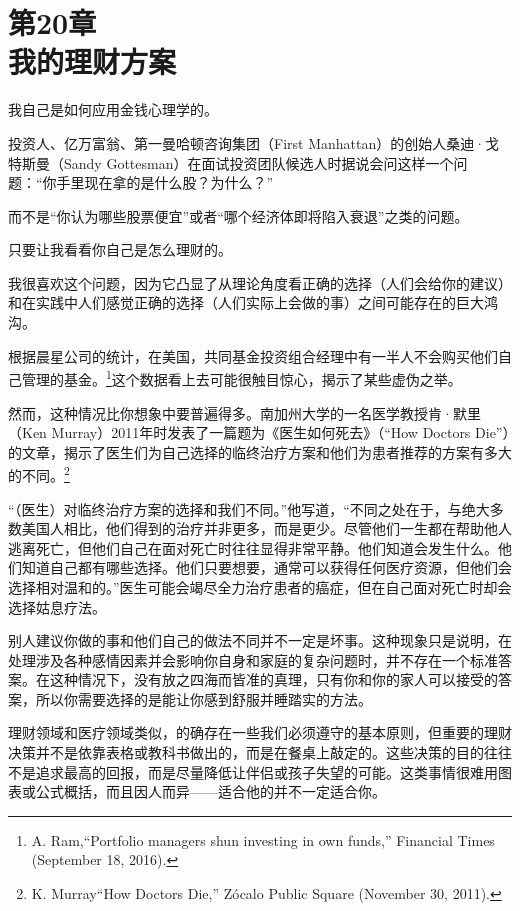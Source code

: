 
\section[第20章\q 我的理财方案]{第20章\\ 我的理财方案}

{\kaishu

我自己是如何应用金钱心理学的。

}

投资人、亿万富翁、第一曼哈顿咨询集团（First Manhattan）的创始人桑迪·戈特斯曼（Sandy Gottesman）在面试投资团队候选人时据说会问这样一个问题：“你手里现在拿的是什么股？为什么？”

而不是“你认为哪些股票便宜”或者“哪个经济体即将陷入衰退”之类的问题。

只要让我看看你自己是怎么理财的。

我很喜欢这个问题，因为它凸显了从理论角度看正确的选择（人们会给你的建议）和在实践中人们感觉正确的选择（人们实际上会做的事）之间可能存在的巨大鸿沟。

根据晨星公司的统计，在美国，共同基金投资组合经理中有一半人不会购买他们自己管理的基金。\footnote{A. Ram,“Portfolio managers shun investing in own funds,” Financial Times (September 18, 2016).}这个数据看上去可能很触目惊心，揭示了某些虚伪之举。

然而，这种情况比你想象中要普遍得多。南加州大学的一名医学教授肯·默里（Ken Murray）2011年时发表了一篇题为《医生如何死去》（“How Doctors Die”）的文章，揭示了医生们为自己选择的临终治疗方案和他们为患者推荐的方案有多大的不同。\footnote{K. Murray“How Doctors Die,” Zócalo Public Square (November 30, 2011).}

“（医生）对临终治疗方案的选择和我们不同。”他写道，“不同之处在于，与绝大多数美国人相比，他们得到的治疗并非更多，而是更少。尽管他们一生都在帮助他人逃离死亡，但他们自己在面对死亡时往往显得非常平静。他们知道会发生什么。他们知道自己都有哪些选择。他们只要想要，通常可以获得任何医疗资源，但他们会选择相对温和的。”医生可能会竭尽全力治疗患者的癌症，但在自己面对死亡时却会选择姑息疗法。

别人建议你做的事和他们自己的做法不同并不一定是坏事。这种现象只是说明，在处理涉及各种感情因素并会影响你自身和家庭的复杂问题时，并不存在一个标准答案。在这种情况下，没有放之四海而皆准的真理，只有你和你的家人可以接受的答案，所以你需要选择的是能让你感到舒服并睡踏实的方法。

理财领域和医疗领域类似，的确存在一些我们必须遵守的基本原则，但重要的理财决策并不是依靠表格或教科书做出的，而是在餐桌上敲定的。这些决策的目的往往不是追求最高的回报，而是尽量降低让伴侣或孩子失望的可能。这类事情很难用图表或公式概括，而且因人而异——适合他的并不一定适合你。

